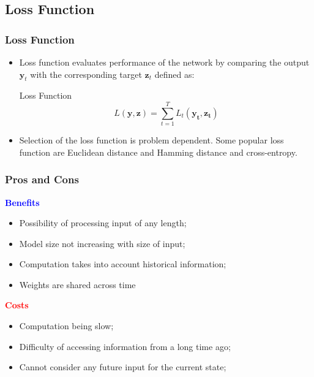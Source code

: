 \documentclass[
	11pt,
]{beamer}
\begin{document}
\subsection{Loss Function}

\begin{frame}
	\frametitle{Loss Function}
	\begin{itemize}
		\item Loss function evaluates performance of the network by comparing the output $\mathbf{y}_t$ with the corresponding target $\mathbf{z}_t$
		defined as:
		\bigskip
	\begin{block}{Loss Function}
		\begin{equation*}
			L(\mathbf{y,z}) = \sum_{t=1}^T L_t(\mathbf{y_t, z_t})
		\end{equation*}
	\end{block}
		\bigskip
		\item Selection of the loss function is problem dependent. Some
	popular loss function are Euclidean distance and Hamming distance and cross-entropy.
\end{itemize}
\end{frame}

\begin{frame}
	\frametitle{Pros and Cons}
	\large{\textcolor{blue}{\textbf{Benefits}}}
	\begin{itemize}
		\item Possibility of processing input of any length;
		\item Model size not increasing with size of input;
		\item Computation takes into account historical information;
		\item Weights are shared across time
	\end{itemize}
	\bigskip
	\large{\textcolor{red}{\textbf{Costs}}}
	\begin{itemize}
		\item Computation being slow;
		\item Difficulty of accessing information from a long time ago;
		\item Cannot consider any future input for the current state;
	\end{itemize}
\end{frame}
\end{document}
